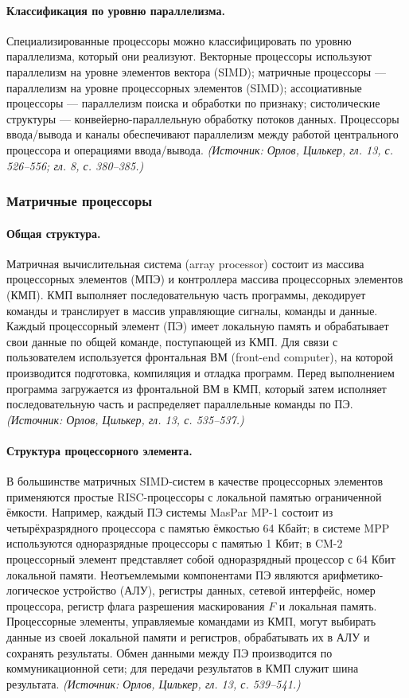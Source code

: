 \documentclass[a4paper,12pt]{article}
\begin{document}
\paragraph{Классификация по уровню параллелизма.}
Специализированные процессоры можно классифицировать по уровню параллелизма, который они реализуют. Векторные процессоры используют параллелизм на уровне элементов вектора (SIMD); матричные процессоры — параллелизм на уровне процессорных элементов (SIMD); ассоциативные процессоры — параллелизм поиска и обработки по признаку; систолические структуры — конвейерно-параллельную обработку потоков данных. Процессоры ввода/вывода и каналы обеспечивают параллелизм между работой центрального процессора и операциями ввода/вывода.
\textit{(Источник: Орлов, Цилькер, гл. 13, с. 526--556; гл. 8, с. 380--385.)}

\subsubsection{Матричные процессоры}

\paragraph{Общая структура.}
Матричная вычислительная система (array processor) состоит из массива процессорных элементов (МПЭ) и контроллера массива процессорных элементов (КМП). КМП выполняет последовательную часть программы, декодирует команды и транслирует в массив управляющие сигналы, команды и данные. Каждый процессорный элемент (ПЭ) имеет локальную память и обрабатывает свои данные по общей команде, поступающей из КМП. Для связи с пользователем используется фронтальная ВМ (front-end computer), на которой производится подготовка, компиляция и отладка программ. Перед выполнением программа загружается из фронтальной ВМ в КМП, который затем исполняет последовательную часть и распределяет параллельные команды по ПЭ.
\textit{(Источник: Орлов, Цилькер, гл. 13, с. 535--537.)}

\paragraph{Структура процессорного элемента.}
В большинстве матричных SIMD-систем в качестве процессорных элементов применяются простые RISC-процессоры с локальной памятью ограниченной ёмкости. Например, каждый ПЭ системы MasPar MP-1 состоит из четырёхразрядного процессора с памятью ёмкостью 64 Кбайт; в системе MPP используются одноразрядные процессоры с памятью 1 Кбит; в CM-2 процессорный элемент представляет собой одноразрядный процессор с 64 Кбит локальной памяти. Неотъемлемыми компонентами ПЭ являются арифметико-логическое устройство (АЛУ), регистры данных, сетевой интерфейс, номер процессора, регистр флага разрешения маскирования \(F\) и локальная память. Процессорные элементы, управляемые командами из КМП, могут выбирать данные из своей локальной памяти и регистров, обрабатывать их в АЛУ и сохранять результаты. Обмен данными между ПЭ производится по коммуникационной сети; для передачи результатов в КМП служит шина результата.
\textit{(Источник: Орлов, Цилькер, гл. 13, с. 539--541.)}
\end{document}
